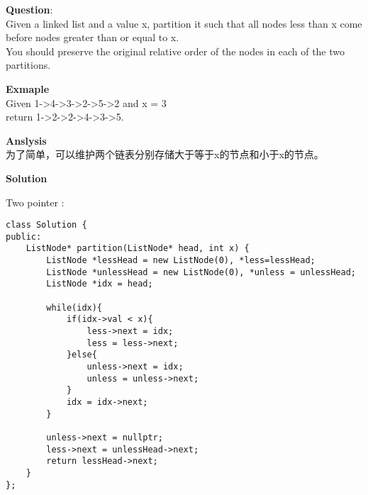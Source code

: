     
\begin{description}
    \item{\textbf{Question}}:\\%
		Given a linked list and a value x, partition it such that all nodes less than x come before nodes greater than or equal to x.\\
		You should preserve the original relative order of the nodes in each of the two partitions.

    \item{\textbf{Exmaple}}\\
		Given 1->4->3->2->5->2 and x = 3\\
		return 1->2->2->4->3->5.

    \item{\textbf{Anslysis}}\\
		为了简单，可以维护两个链表分别存储大于等于x的节点和小于x的节点。

    \item{\textbf{Solution}}
	\item{Two pointer} : \\
		\begin{lstlisting}
class Solution {
public:
    ListNode* partition(ListNode* head, int x) {	
    	ListNode *lessHead = new ListNode(0), *less=lessHead;
    	ListNode *unlessHead = new ListNode(0), *unless = unlessHead;
    	ListNode *idx = head;
    
    	while(idx){
    		if(idx->val < x){
    			less->next = idx;
    			less = less->next;
    		}else{
    			unless->next = idx;
    			unless = unless->next;
    		}
    		idx = idx->next;
    	}
        
        unless->next = nullptr;
    	less->next = unlessHead->next;
    	return lessHead->next;
    }
};		\end{lstlisting}

\end{description}

